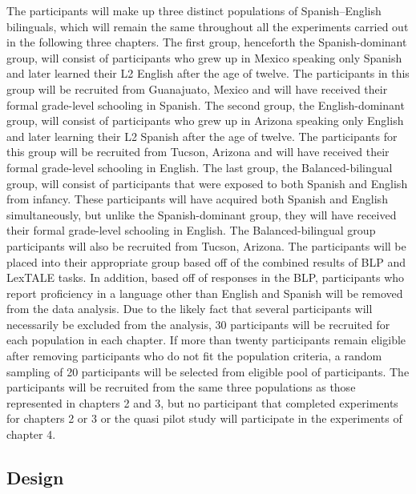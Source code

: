 The participants will make up three distinct populations of Spanish–English bilinguals, which will remain the same throughout all the experiments carried out in the following three chapters. The first group, henceforth the Spanish-dominant group, will consist of participants who grew up in Mexico speaking only Spanish and later learned their L2 English after the age of twelve. The participants in this group will be recruited from Guanajuato, Mexico and will have received their formal grade-level schooling in Spanish. The second group, the English-dominant group, will consist of participants who grew up in Arizona speaking only English and later learning their L2 Spanish after the age of twelve. The participants for this group will be recruited from Tucson, Arizona and will have received their formal grade-level schooling in English. The last group, the Balanced-bilingual group, will consist of participants that were exposed to both Spanish and English from infancy. These participants will have acquired both Spanish and English simultaneously, but unlike the Spanish-dominant group, they will have received their formal grade-level schooling in English. The Balanced-bilingual group participants will also be recruited from Tucson, Arizona. The participants will be placed into their appropriate group based off of the combined results of BLP and LexTALE tasks. In addition, based off of responses in the BLP, participants who report proficiency in a language other than English and Spanish will be removed from the data analysis. Due to the likely fact that several participants will necessarily be excluded from the analysis, 30 participants will be recruited for each population in each chapter. If more than twenty participants remain eligible after removing participants who do not fit the population criteria, a random sampling of 20 participants will be selected from eligible pool of participants. The participants will be recruited from the same three populations as those represented in chapters 2 and 3, but no participant that completed experiments for chapters 2 or 3 or the quasi pilot study will participate in the experiments of chapter 4. 



\subsection{Design}

